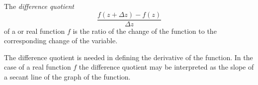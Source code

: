 \documentclass[12pt]{article}
\theoremstyle{definition}
\begin{document}
The {\em difference quotient}
$$\frac{f(z+\Delta{z})-f(z)}{\Delta{z}}$$
of a  or real function $f$ is the ratio of the change of the function to the corresponding change of the variable.

The difference quotient is needed in defining the derivative of the function.  In the case of a real function $f$ the difference quotient may be interpreted as the slope of a secant line of the graph of the function.
\end{document}
